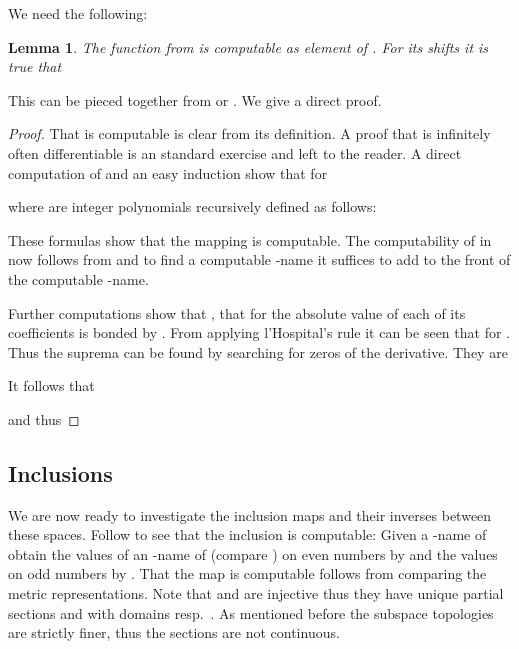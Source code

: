 \documentclass{eptcs-modified}
\newtheorem{lemma}[theorem]{Lemma}
\begin{document}
			We need the following:
			\begin{lemma}\label{resu:f and its shifts}
				The function  from  is computable as element of .
				For its shifts  it is true that
				
			\end{lemma}
			This can be pieced together from \cite{zhong} or \cite{MR3377508}.
			We give a direct proof.
			\begin{proof}
				That  is computable is clear from its definition.
				A proof that  is infinitely often differentiable is an standard exercise and left to the reader.
				A direct computation of  and an easy induction show that for 
				
				where  are integer polynomials recursively defined as follows:
				
				These formulas show that the mapping  is computable.
				The computability of  in  now follows from  and to find a computable -name it suffices to add  to the front of the computable -name.

				Further computations show that , that for  the absolute value of each of its coefficients is bonded by .
				From applying l'Hospital's rule it can be seen that  for .
				Thus the suprema can be found by searching for zeros of the derivative.
				They are
				
				It follows that
				
				and thus
				
			\end{proof}

		\subsection{Inclusions}
			We are now ready to investigate the inclusion maps and their inverses between these spaces.
			Follow \cite[Proposition 5.4]{zhong} to see that the inclusion  is computable:
			Given a -name  of  obtain the values of an -name of  (compare ) on even numbers by  and the values on odd numbers by .
			That the map  is computable follows from comparing the metric representations.
			Note that  and  are injective thus they have unique partial sections  and  with domains  resp.\ .
			As mentioned before the subspace topologies are strictly finer, thus the sections are not continuous.
\end{document}
